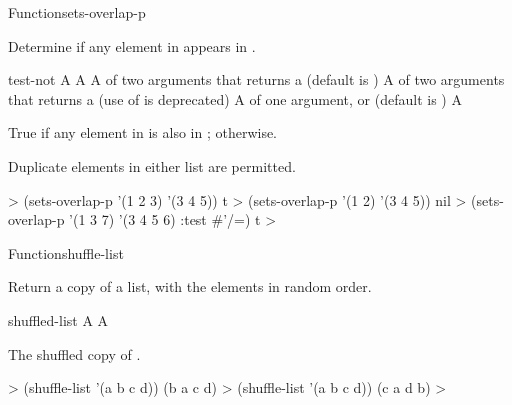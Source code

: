 \documentclass[10pt,twoside,english,pdftex]{article}
\begin{document}
\begin{functiondoc}{Function}{sets-overlap-p}{%
    }

\fnsyntax

\fnpurpose Determine if any element in  appears in 
.

\fnpackage {}

\fnmodule {}

\fnargs
\begin{args}{test-not}
\arg[list-1] A 
\arg[list-2] A 
\arg[test] A  of two arguments that returns a
 (default is ) 
 A  of two arguments that returns a
 (use of  is deprecated)
\arg[key] A  of one argument, or \nil{} (default is \nil)
\arg[boolean] A 
\end{args}

\fnreturns True if any element in  is also in
; \nil{} otherwise.

\fndescription Duplicate elements in either list are permitted.

\fnexamples
%
\W\supp
\begin{example}
  > (sets-overlap-p '(1 2 3) '(3 4 5))
  t
  > (sets-overlap-p '(1 2) '(3 4 5))
  nil
  > (sets-overlap-p '(1 3 7) '(3 4 5 6) :test #'/=)
  t
  >
\end{example}

\end{functiondoc}


\begin{functiondoc}{Function}{shuffle-list}{
    }
%

\fnsyntax

\fnpurpose Return a copy of a list, with the elements in random order.

\fnpackage {}

\fnmodule {}

\fnargs
\begin{args}{shuffled-list}
\arg[list] A 
 A 
\end{args}

\fnreturns The shuffled copy of .

\fnexamples
%
\W\supp
\begin{example}
  > (shuffle-list '(a b c d))
  (b a c d)
  > (shuffle-list '(a b c d))
  (c a d b)
  >
\end{example}

\end{functiondoc}
\end{document}
